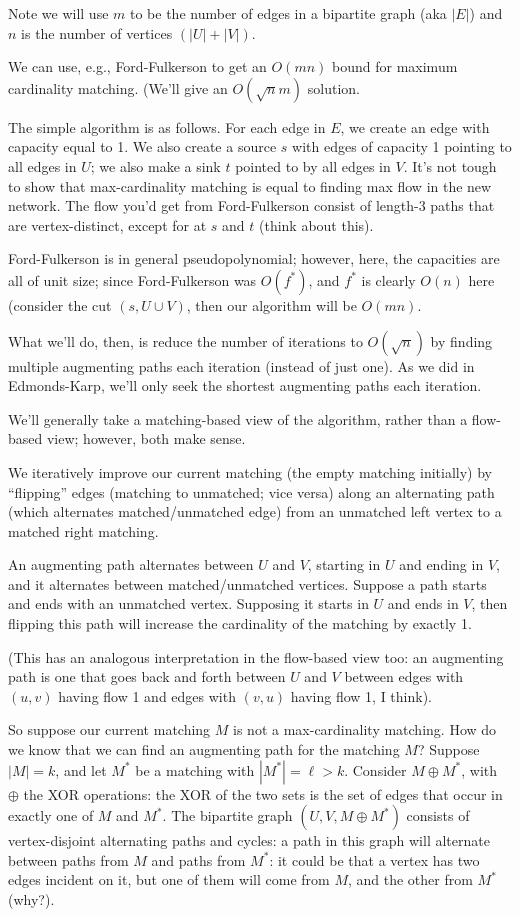 \documentclass{article}
\begin{document}
Note we will use $m$ to be the number of edges in a bipartite graph (aka $|E|$)
and $n$ is the number of vertices $(|U| + |V|)$.

We can use, e.g., Ford-Fulkerson to get an $O(mn)$ bound for
maximum cardinality matching.
(We'll give an $O(\sqrt n m)$ solution.

The simple algorithm is as follows.
For each edge in $E$, we create an edge with capacity equal to 1.
We also create a source $s$ with edges of capacity 1 pointing to all edges
in $U$; we also make a sink $t$ pointed to by all edges in $V$.
It's not tough to show that max-cardinality matching is equal to finding
max flow in the new network.
The flow you'd get from Ford-Fulkerson consist of length-3 paths
that are vertex-distinct, except for at $s$ and $t$ (think about this).

Ford-Fulkerson is in general pseudopolynomial; however, here, the capacities
are all of unit size; since Ford-Fulkerson was $O(f^*)$, and $f^*$ is 
clearly $O(n)$ here (consider the cut $(s, U \cup V)$, then our algorithm will be $O(mn)$.

What we'll do, then, is reduce the number of iterations to $O(\sqrt n)$ by
finding multiple augmenting paths each iteration (instead of just one).
As we did in Edmonds-Karp, we'll only seek the shortest augmenting paths
each iteration.

We'll generally take a matching-based view of the algorithm, rather
than a flow-based view; however, both make sense.

We iteratively improve our current matching (the empty matching
initially) by ``flipping'' edges (matching to unmatched; vice versa)
along an alternating path (which alternates matched/unmatched edge)
from an unmatched left vertex to a matched right matching.

An augmenting path alternates between $U$ and $V$, starting in $U$ and
ending in $V$, and it 
alternates between matched/unmatched vertices.
Suppose a path starts and ends with an unmatched vertex. Supposing
it starts in $U$ and ends in $V$, then flipping this path will
increase the cardinality of the matching by exactly 1.

(This has an analogous interpretation in the flow-based view too:
an augmenting path is one that goes back and forth between $U$
and $V$ between edges with $(u,v)$ having flow 1 and edges with $(v,u)$ having
flow 1, I think).

So suppose our current matching $M$ is not a max-cardinality matching.
How do we know that we can find an augmenting path for the matching $M$?
Suppose $|M| = k$, and let $M^*$ be a matching with $|M^*| = \ell> k$.
Consider $M \oplus M^*$, with $\oplus$ the XOR operations: the XOR of the
two sets is the set of edges that occur in exactly one of $M$ and $M^*$.
The bipartite graph $(U,V,M\oplus M^*)$ consists of vertex-disjoint
alternating paths and cycles: a path in this graph will alternate
between paths from $M$ and paths from $M^*$: it could be that a vertex has
two edges incident on it, but one of them will come from $M$, and the other
from $M^*$ (why?).
\end{document}
